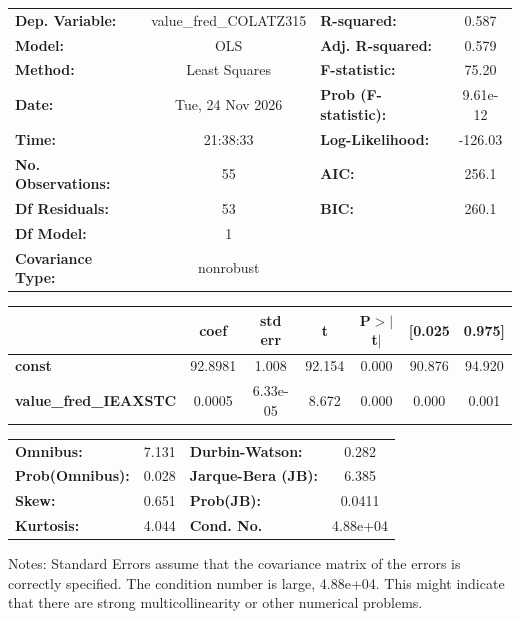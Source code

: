 \begin{center}
\begin{tabular}{lclc}
\toprule
\textbf{Dep. Variable:}       & value\_fred\_COLATZ315 & \textbf{  R-squared:         } &     0.587   \\
\textbf{Model:}               &          OLS           & \textbf{  Adj. R-squared:    } &     0.579   \\
\textbf{Method:}              &     Least Squares      & \textbf{  F-statistic:       } &     75.20   \\
\textbf{Date:}                &    Tue, 24 Nov 2026    & \textbf{  Prob (F-statistic):} &  9.61e-12   \\
\textbf{Time:}                &        21:38:33        & \textbf{  Log-Likelihood:    } &   -126.03   \\
\textbf{No. Observations:}    &             55         & \textbf{  AIC:               } &     256.1   \\
\textbf{Df Residuals:}        &             53         & \textbf{  BIC:               } &     260.1   \\
\textbf{Df Model:}            &              1         & \textbf{                     } &             \\
\textbf{Covariance Type:}     &       nonrobust        & \textbf{                     } &             \\
\bottomrule
\end{tabular}
\begin{tabular}{lcccccc}
                              & \textbf{coef} & \textbf{std err} & \textbf{t} & \textbf{P$> |$t$|$} & \textbf{[0.025} & \textbf{0.975]}  \\
\midrule
\textbf{const}                &      92.8981  &        1.008     &    92.154  &         0.000        &       90.876    &       94.920     \\
\textbf{value\_fred\_IEAXSTC} &       0.0005  &     6.33e-05     &     8.672  &         0.000        &        0.000    &        0.001     \\
\bottomrule
\end{tabular}
\begin{tabular}{lclc}
\textbf{Omnibus:}       &  7.131 & \textbf{  Durbin-Watson:     } &    0.282  \\
\textbf{Prob(Omnibus):} &  0.028 & \textbf{  Jarque-Bera (JB):  } &    6.385  \\
\textbf{Skew:}          &  0.651 & \textbf{  Prob(JB):          } &   0.0411  \\
\textbf{Kurtosis:}      &  4.044 & \textbf{  Cond. No.          } & 4.88e+04  \\
\bottomrule
\end{tabular}
\end{center}

Notes: \newline
 [1] Standard Errors assume that the covariance matrix of the errors is correctly specified. \newline
 [2] The condition number is large, 4.88e+04. This might indicate that there are \newline
 strong multicollinearity or other numerical problems.